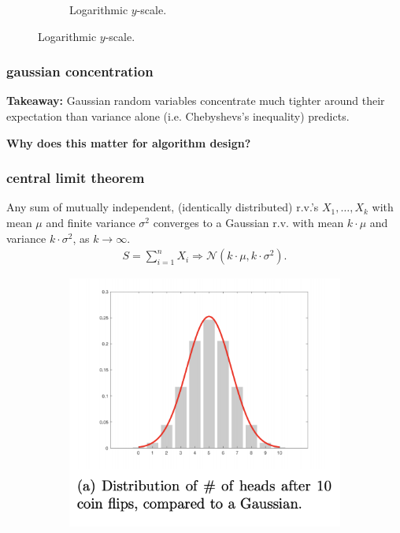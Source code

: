 \documentclass[handout,compress]{beamer}
\begin{document}
\begin{frame}
\begin{figure}
\begin{subfigure}[t]{0.45\textwidth}
			\caption{Logarithmic $y$-scale.}
		\end{subfigure}
	\end{figure}
	
\end{frame}

\begin{frame}
	\frametitle{gaussian concentration}
	\textbf{Takeaway:} Gaussian random variables concentrate much tighter around their expectation than variance alone (i.e. Chebyshevs's inequality)  predicts.
	
	\begin{center}
		\alert{\textbf{Why does this matter for algorithm design?}}
	\end{center}
\end{frame}

\begin{frame}
	\frametitle{central limit theorem}
	\begin{theorem}
		Any sum of \alert{mutually independent}, \alert{(identically distributed)}  r.v.'s $X_1,  \ldots, X_k$ with mean $\mu$ and finite variance $\sigma^2$ converges to a Gaussian r.v. with mean $k\cdot\mu$ and variance $k\cdot\sigma^2$, as $k\rightarrow \infty$.
		\vspace{-.5em}
		\begin{align*}
			S = \sum_{i=1}^n X_i \Longrightarrow \mathcal{N}(k\cdot\mu, k\cdot\sigma^2).
		\end{align*}	
		\vspace{-.5em}	
	\end{theorem}
	\vspace{-.5em}	
	\begin{figure}
		\begin{subfigure}[t]{0.4\textwidth}
			\centering
			\includegraphics[width=\textwidth]{cltWide.png}

\end{subfigure}
\end{figure}
\end{frame}
\end{document}
